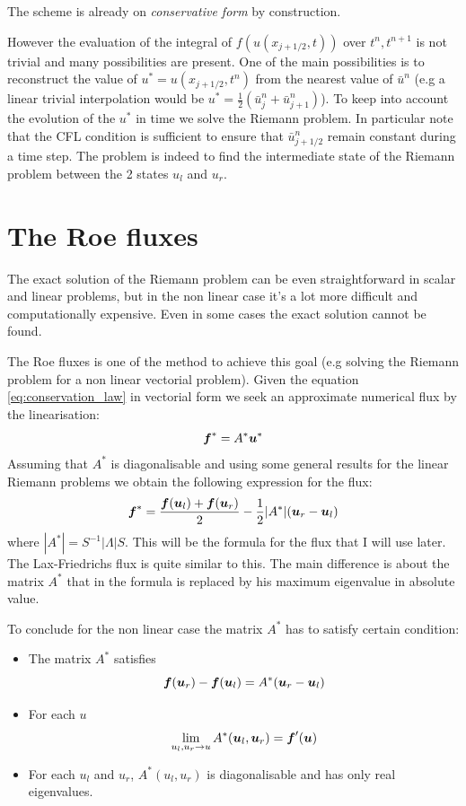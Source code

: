 \documentclass[oneside,12pt]{book}  %
\theoremstyle{plain}
\theoremstyle{definition}
\theoremstyle{remark}
\numberwithin{equation}{chapter} %
\begin{document}
The scheme is already on \textit{conservative form} by construction.

However the evaluation of the integral of $f(u(x_{j+1/2},t))$ over
$t^n,t^{n+1}$ is not trivial and many possibilities are present.
One of the main possibilities is to reconstruct the value of
$u^*=u(x_{j+1/2},t^n)$ from the nearest value of $\bar{u}^n$ (e.g a
linear trivial interpolation would be
$u^*=\frac{1}{2}(\bar{u}^n_j+\bar{u}^n_{j+1})$). To keep into account
the evolution of the $u^*$ in time we solve the Riemann problem. In
particular note that the CFL condition is sufficient to ensure that
$\bar{u}^n_{j+1/2}$ remain constant during a time step. The problem is
indeed to find the intermediate state of the Riemann problem  between
the 2 states $u_l$ and $u_r$.

\section{The Roe fluxes}
The exact solution of the Riemann problem can be even straightforward in
scalar and linear problems, but in the non linear case it's a lot more
difficult and computationally expensive. Even in some cases the exact
solution cannot be found.

The Roe fluxes is one of the method to achieve this goal (e.g solving
the Riemann problem for a non linear vectorial problem). 
Given the equation \ref{eq:conservation_law} in vectorial form we seek
an approximate numerical flux by the linearisation:
\begin{equation}
  \label{eq:linearization_roe}
  {\mbox{\boldmath$f$}}^*=A^*{\mbox{\boldmath$u$}}^*
\end{equation}
Assuming that $A^*$ is diagonalisable and using some general results
for the linear Riemann problems we obtain the following expression for
the flux:
\begin{equation}
  \label{eq:roe_flux}
  {\mbox{\boldmath$f$}}^*=\frac{{\mbox{\boldmath$f$}}({\mbox{\boldmath$u$}}_l)+{\mbox{\boldmath$f$}}({\mbox{\boldmath$u$}}_r)}{2} -\frac{1}{2}|A^*|({\mbox{\boldmath$u$}}_r-{\mbox{\boldmath$u$}}_l)
\end{equation}
where $|A^*|=S^{-1}|\Lambda | S$.
This will be the formula for the flux that I will use later.
The Lax-Friedrichs flux is quite similar to this. The main difference
is about the matrix $A^*$ that in the formula is replaced by his
maximum eigenvalue in absolute value.

To conclude for the non linear case the matrix $A^*$ has to satisfy
certain condition:
\begin{itemize}
\item
The matrix $A^*$ satisfies
\begin{equation}
  \label{eq:roe_condition1}
  {\mbox{\boldmath$f$}}({\mbox{\boldmath$u$}}_r)-{\mbox{\boldmath$f$}}({\mbox{\boldmath$u$}}_l)=A^*({\mbox{\boldmath$u$}}_r-{\mbox{\boldmath$u$}}_l)
\end{equation}
\item
For each $u$
\begin{equation}
  \label{eq:roe_condition2}
  \lim_{u_l,u_r \to u}A ^*({\mbox{\boldmath$u$}}_l,{\mbox{\boldmath$u$}}_r)={\mbox{\boldmath$f$}}'({\mbox{\boldmath$u$}})
\end{equation}
\item
For each $u_l$ and $u_r$, $A^*(u_l,u_r)$ is diagonalisable and has
only real eigenvalues.
\end{itemize}
\end{document}
